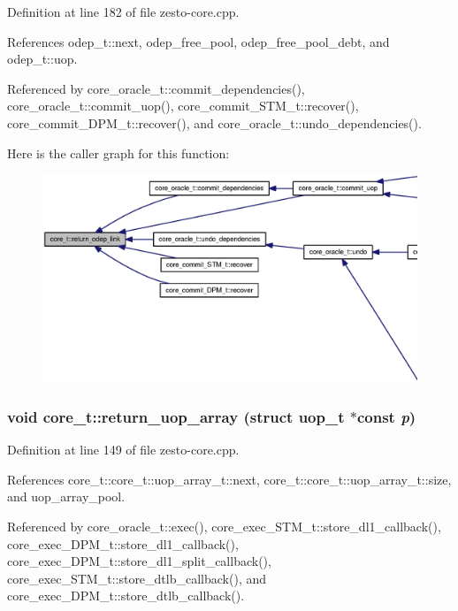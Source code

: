 Definition at line 182 of file zesto-core.cpp.

References odep\_\-t::next, odep\_\-free\_\-pool, odep\_\-free\_\-pool\_\-debt, and odep\_\-t::uop.

Referenced by core\_\-oracle\_\-t::commit\_\-dependencies(), core\_\-oracle\_\-t::commit\_\-uop(), core\_\-commit\_\-STM\_\-t::recover(), core\_\-commit\_\-DPM\_\-t::recover(), and core\_\-oracle\_\-t::undo\_\-dependencies().

Here is the caller graph for this function:\nopagebreak
\begin{figure}[H]
\begin{center}
\leavevmode
\includegraphics[width=420pt]{classcore__t_c76899d81828f8557930f9ab87f4938e_icgraph}
\end{center}
\end{figure}
\subsubsection[{return\_\-uop\_\-array}]{\setlength{\rightskip}{0pt plus 5cm}void core\_\-t::return\_\-uop\_\-array (struct {\bf uop\_\-t} $\ast$const  {\em p})}\label{classcore__t_466dcf5a0ecb9fd32ad557561286dfc9}




Definition at line 149 of file zesto-core.cpp.

References core\_\-t::core\_\-t::uop\_\-array\_\-t::next, core\_\-t::core\_\-t::uop\_\-array\_\-t::size, and uop\_\-array\_\-pool.

Referenced by core\_\-oracle\_\-t::exec(), core\_\-exec\_\-STM\_\-t::store\_\-dl1\_\-callback(), core\_\-exec\_\-DPM\_\-t::store\_\-dl1\_\-callback(), core\_\-exec\_\-DPM\_\-t::store\_\-dl1\_\-split\_\-callback(), core\_\-exec\_\-STM\_\-t::store\_\-dtlb\_\-callback(), and core\_\-exec\_\-DPM\_\-t::store\_\-dtlb\_\-callback().

